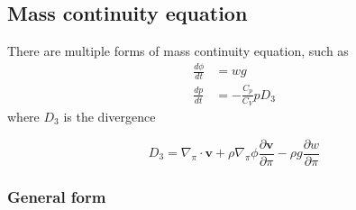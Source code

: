 \documentclass[12pt]{article}
\renewcommand{\d}[2]{\frac{d #1}{d #2}}
\newcommand{\dt}[1]{\d{#1}{t}}
\newcommand{\pd}[2]{\frac{\partial #1}{\partial #2}}
\newcommand{\cpocv}{\frac{C_p}{C_V}}
\renewcommand{\vec}[1]{\mathbf{#1}}
\begin{document}
\subsection{Mass continuity equation}

There are multiple forms of mass continuity equation, such as
\begin{align*}
  \dt{\phi} & = w g \\
  \dt{p} & = - \cpocv p D_3
\end{align*}
where $D_3$ is the divergence

\begin{equation}
  D_3 = \nabla_\pi \cdot \vec{v} + \rho \nabla_\pi \phi \pd{\vec{v}}{\pi} - \rho g \pd{w}{\pi}
\end{equation}

\subsubsection{General form}
\end{document}
